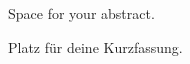 
\cleardoubleoddpage%
\begin{abstract*}
	Space for your abstract.
\end{abstract*}




\cleardoubleoddpage%
\begin{otherlanguage}{ngerman}
	\begin{abstract*}
		Platz für deine Kurzfassung.
	\end{abstract*}
\end{otherlanguage}

